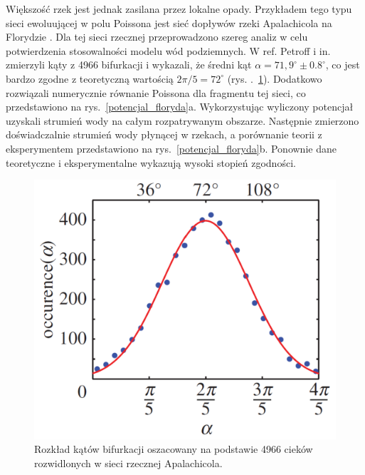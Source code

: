 \documentclass[]{pracamgr}
\begin{document}
      Większość rzek jest jednak zasilana przez lokalne opady. Przykładem tego typu sieci ewoluującej w polu Poissona jest sieć dopływów rzeki Apalachicola na Florydzie \cite{schumm1995ground}. Dla tej sieci rzecznej przeprowadzono szereg analiz w celu potwierdzenia stosowalności modelu wód podziemnych. W ref. \cite{petroff2013bifurcation} Petroff i in. zmierzyli kąty z 4966 bifurkacji i wykazali, że średni kąt $\alpha = 71,9^\circ \pm 0.8^\circ$, co jest bardzo zgodne z teoretyczną wartością $2\pi/5=72^\circ$ (rys. .~\ref{apalachicola_katy}). Dodatkowo rozwiązali numerycznie równanie Poissona dla fragmentu tej sieci, co przedstawiono na rys.~\ref{potencjal_floryda}a. Wykorzystując wyliczony potencjał uzyskali strumień wody na całym rozpatrywanym obszarze. Następnie zmierzono doświadczalnie strumień wody płynącej w rzekach, a porównanie teorii z eksperymentem przedstawiono na rys.~\ref{potencjal_floryda}b. Ponownie dane teoretyczne i eksperymentalne wykazują wysoki stopień zgodności.

      \begin{figure}[H]
        \centering
        \begin{minipage}{0.4\textwidth}
          \caption{Rozkład kątów bifurkacji oszacowany na podstawie 4966 cieków rozwidlonych w sieci rzecznej Apalachicola.}
          \label{apalachicola_katy}
        \end{minipage}
        \hspace{20pt}
        \begin{minipage}{0.5\textwidth}
          \centering
          \includegraphics[width=1\textwidth]{figs/florida_angles.png}
          \end{minipage}
    \end{figure}  
\end{document}
